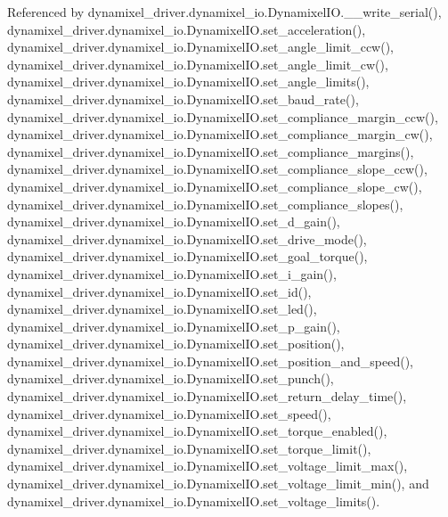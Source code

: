 Referenced by dynamixel\+\_\+driver.\+dynamixel\+\_\+io.\+Dynamixel\+I\+O.\+\_\+\+\_\+write\+\_\+serial(), dynamixel\+\_\+driver.\+dynamixel\+\_\+io.\+Dynamixel\+I\+O.\+set\+\_\+acceleration(), dynamixel\+\_\+driver.\+dynamixel\+\_\+io.\+Dynamixel\+I\+O.\+set\+\_\+angle\+\_\+limit\+\_\+ccw(), dynamixel\+\_\+driver.\+dynamixel\+\_\+io.\+Dynamixel\+I\+O.\+set\+\_\+angle\+\_\+limit\+\_\+cw(), dynamixel\+\_\+driver.\+dynamixel\+\_\+io.\+Dynamixel\+I\+O.\+set\+\_\+angle\+\_\+limits(), dynamixel\+\_\+driver.\+dynamixel\+\_\+io.\+Dynamixel\+I\+O.\+set\+\_\+baud\+\_\+rate(), dynamixel\+\_\+driver.\+dynamixel\+\_\+io.\+Dynamixel\+I\+O.\+set\+\_\+compliance\+\_\+margin\+\_\+ccw(), dynamixel\+\_\+driver.\+dynamixel\+\_\+io.\+Dynamixel\+I\+O.\+set\+\_\+compliance\+\_\+margin\+\_\+cw(), dynamixel\+\_\+driver.\+dynamixel\+\_\+io.\+Dynamixel\+I\+O.\+set\+\_\+compliance\+\_\+margins(), dynamixel\+\_\+driver.\+dynamixel\+\_\+io.\+Dynamixel\+I\+O.\+set\+\_\+compliance\+\_\+slope\+\_\+ccw(), dynamixel\+\_\+driver.\+dynamixel\+\_\+io.\+Dynamixel\+I\+O.\+set\+\_\+compliance\+\_\+slope\+\_\+cw(), dynamixel\+\_\+driver.\+dynamixel\+\_\+io.\+Dynamixel\+I\+O.\+set\+\_\+compliance\+\_\+slopes(), dynamixel\+\_\+driver.\+dynamixel\+\_\+io.\+Dynamixel\+I\+O.\+set\+\_\+d\+\_\+gain(), dynamixel\+\_\+driver.\+dynamixel\+\_\+io.\+Dynamixel\+I\+O.\+set\+\_\+drive\+\_\+mode(), dynamixel\+\_\+driver.\+dynamixel\+\_\+io.\+Dynamixel\+I\+O.\+set\+\_\+goal\+\_\+torque(), dynamixel\+\_\+driver.\+dynamixel\+\_\+io.\+Dynamixel\+I\+O.\+set\+\_\+i\+\_\+gain(), dynamixel\+\_\+driver.\+dynamixel\+\_\+io.\+Dynamixel\+I\+O.\+set\+\_\+id(), dynamixel\+\_\+driver.\+dynamixel\+\_\+io.\+Dynamixel\+I\+O.\+set\+\_\+led(), dynamixel\+\_\+driver.\+dynamixel\+\_\+io.\+Dynamixel\+I\+O.\+set\+\_\+p\+\_\+gain(), dynamixel\+\_\+driver.\+dynamixel\+\_\+io.\+Dynamixel\+I\+O.\+set\+\_\+position(), dynamixel\+\_\+driver.\+dynamixel\+\_\+io.\+Dynamixel\+I\+O.\+set\+\_\+position\+\_\+and\+\_\+speed(), dynamixel\+\_\+driver.\+dynamixel\+\_\+io.\+Dynamixel\+I\+O.\+set\+\_\+punch(), dynamixel\+\_\+driver.\+dynamixel\+\_\+io.\+Dynamixel\+I\+O.\+set\+\_\+return\+\_\+delay\+\_\+time(), dynamixel\+\_\+driver.\+dynamixel\+\_\+io.\+Dynamixel\+I\+O.\+set\+\_\+speed(), dynamixel\+\_\+driver.\+dynamixel\+\_\+io.\+Dynamixel\+I\+O.\+set\+\_\+torque\+\_\+enabled(), dynamixel\+\_\+driver.\+dynamixel\+\_\+io.\+Dynamixel\+I\+O.\+set\+\_\+torque\+\_\+limit(), dynamixel\+\_\+driver.\+dynamixel\+\_\+io.\+Dynamixel\+I\+O.\+set\+\_\+voltage\+\_\+limit\+\_\+max(), dynamixel\+\_\+driver.\+dynamixel\+\_\+io.\+Dynamixel\+I\+O.\+set\+\_\+voltage\+\_\+limit\+\_\+min(), and dynamixel\+\_\+driver.\+dynamixel\+\_\+io.\+Dynamixel\+I\+O.\+set\+\_\+voltage\+\_\+limits().


